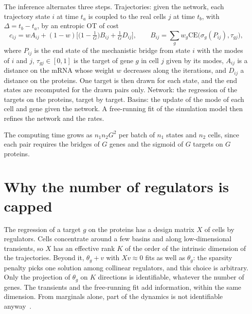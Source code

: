 \documentclass[a4paper, 11pt]{article}
\newcommand{\CE}{\mathrm{CE}}
\theoremstyle{plain}
\theoremstyle{remark}
\begin{document}
The inference alternates three steps. Trajectories: given the network, each trajectory state $i$ at time $t_a$ is coupled to the real cells $j$ at time $t_b$, with $\Delta = t_b - t_a$, by an entropic OT of cost
\begin{equation}\label{eq:current-cost}
c_{ij} = w A_{ij} + (1 - w)\Big[\big(1 - \tfrac{1}{G}\big) B_{ij} + \tfrac{1}{G} D_{ij}\Big],
\qquad B_{ij} = \sum_g w_g \CE\big(\sigma_g(P_{ij}), \tau_{gj}\big),
\end{equation}
where $P_{ij}$ is the end state of the mechanistic bridge from state $i$ with the modes of $i$ and $j$, $\tau_{gj} \in [0,1]$ is the target of gene $g$ in cell $j$ given by its modes, $A_{ij}$ is a distance on the mRNA whose weight $w$ decreases along the iterations, and $D_{ij}$ a distance on the proteins. One target is then drawn for each state, and the end states are recomputed for the drawn pairs only. Network: the regression of the targets on the proteins, target by target. Basins: the update of the mode of each cell and gene given the network. A free-running fit of the simulation model then refines the network and the rates.

The computing time grows as $n_1 n_2 G^2$ per batch of $n_1$ states and $n_2$ cells, since each pair requires the bridges of $G$ genes and the sigmoid of $G$ targets on $G$ proteins.

\section{Why the number of regulators is capped}\label{sec:cap}

The regression of a target $g$ on the proteins has a design matrix $X$ of cells by regulators. Cells concentrate around a few basins and along low-dimensional transients, so $X$ has an effective rank $K$ of the order of the intrinsic dimension of the trajectories. Beyond it, $\theta_g + v$ with $Xv \approx 0$ fits as well as $\theta_g$: the sparsity penalty picks one solution among collinear regulators, and this choice is arbitrary. Only the projection of $\theta_g$ on $K$ directions is identifiable, whatever the number of genes. The transients and the free-running fit add information, within the same dimension. From marginals alone, part of the dynamics is not identifiable anyway~\cite{weinreb2018fundamental, lavenant2021towards}.
\end{document}
